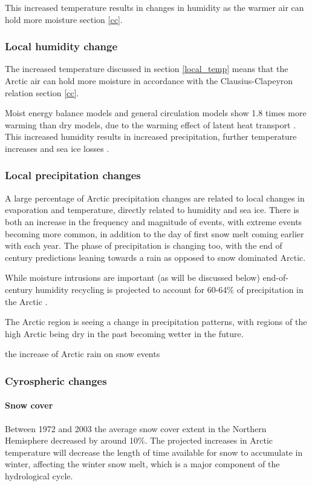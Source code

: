 \documentclass[12pt, oneside]{article}
\begin{document}
This increased temperature results in changes in humidity as the warmer air can hold more moisture section \ref{cc}. 

\subsubsection{Local humidity change}
The increased temperature discussed in section \ref{local_temp} means that the Arctic air can hold more moisture in accordance with the Clausius-Clapeyron relation section \ref{cc}. 


Moist energy balance models and general circulation models show 1.8 times more warming than dry models, due to the warming effect of latent heat transport \cite{feldl2021polar}. This increased humidity results in increased precipitation, further temperature increases and sea ice losses \cite{mccrystall2021new}. 


\subsubsection{Local precipitation changes}
A large percentage of Arctic precipitation changes are related to local changes in evaporation and temperature, directly related to humidity and sea ice. There is both an increase in the frequency and magnitude of events, with extreme events becoming more common, in addition to the day of first snow melt coming earlier with each year. The phase of precipitation is changing too, with the end of century predictions leaning towards a rain as opposed to snow dominated Arctic. 


While moisture intrusions are important (as will be discussed below) end-of-century humidity recycling is projected to account for 60-64\% of precipitation in the Arctic \cite{ford2022arctic}.

The Arctic region is seeing a change in precipitation patterns, with regions of the high Arctic being dry in the past becoming wetter in the future. 

the increase of Arctic rain on snow events \cite{serreze2021arctic}



\subsubsection{Cyrospheric changes}
\paragraph{Snow cover}
Between 1972 and 2003 the average snow cover extent in the Northern Hemisphere decreased by around 10\%. The projected increases in Arctic temperature will decrease the length of time available for snow to accumulate in winter, affecting the winter snow melt, which is a major component of the hydrological cycle. 
\end{document}

